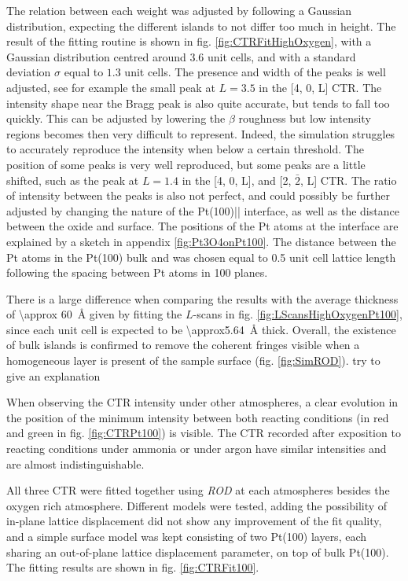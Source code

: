 The relation between each weight was adjusted by following a Gaussian distribution, expecting the different islands to not differ too much in height.
The result of the fitting routine is shown in fig. \ref{fig:CTRFitHighOxygen}, with a Gaussian distribution centred around $3.6$ unit cells, and with a standard deviation $\sigma$ equal to $1.3$ unit cells.
The presence and width of the  peaks is well adjusted, see for example the small peak at $L=3.5$ in the [4, 0, L] CTR.
The intensity shape near the Bragg peak is also quite accurate, but tends to fall too quickly.
This can be adjusted by lowering the $\beta$ roughness but low intensity regions becomes then very difficult to represent.
Indeed, the simulation struggles to accurately reproduce the intensity when below a certain threshold.
The position of some peaks is very well reproduced, but some peaks are a little shifted, such as the peak at $L=1.4$ in the [4, 0, L], and [2, $\bar{2}$, L] CTR.
The ratio of intensity between the  peaks is also not perfect, and could possibly be further adjusted by changing the nature of the Pt(100)|| interface, as well as the distance between the oxide and surface.
The positions of the Pt atoms at the interface are explained by a sketch in appendix \ref{fig:Pt3O4onPt100}.
The distance between the Pt atoms in the Pt(100) bulk and  was chosen equal to \num{0.5} unit cell lattice length following the spacing between Pt atoms in {100} planes.

There is a large difference when comparing the results with the average thickness of \qty{\approx 60}{\angstrom} given by fitting the $L$-scans in fig. \ref{fig:LScansHighOxygenPt100}, since each unit cell is expected to be \qty{\approx5.64}{\angstrom} thick.
Overall, the existence of bulk  islands is confirmed to remove the coherent fringes visible when a homogeneous layer is present of the sample surface (fig. \ref{fig:SimROD}).
\textcolor{Important}{try to give an explanation}

When observing the CTR intensity under other atmospheres, a clear evolution in the position of the minimum intensity between both reacting conditions (in red and green in fig. \ref{fig:CTRPt100}) is visible.
The CTR recorded after exposition to reacting conditions under ammonia or under argon have similar intensities and are almost indistinguishable.

All three CTR were fitted together using \textit{ROD} at each atmospheres besides the oxygen rich atmosphere.
Different models were tested, adding the possibility of in-plane lattice displacement did not show any improvement of the fit quality, and a simple surface model was kept consisting of two Pt(100) layers, each sharing an out-of-plane lattice displacement parameter, on top of bulk Pt(100).
The fitting results are shown in fig. \ref{fig:CTRFit100}.

